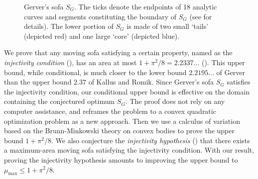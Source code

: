 \begin{figure}
\centering

\caption{Gerver’s sofa \(S_G\). The ticks denote the endpoints of 18 analytic curves and segments constituting the boundary of \(S_G\) (see \autocite{romikDifferentialEquationsExact2018} for details). The lower portion of \(S_G\) is made of two small ‘tails’ (depicted red) and one large ‘core’ (depicted blue).}
\label{fig:gerver}
\end{figure}

We prove that any moving sofa satisfying a certain property, named as the \emph{injectivity condition} (), has an area at most \(1 + \pi^2/8 = 2.2337\dots\) (). This upper bound, while conditional, is much closer to the lower bound \(2.2195\dots\) of Gerver than the upper bound \(2.37\) of Kallus and Romik. Since Gerver’s sofa \(S_G\) satisfies the injectivity condition, our conditional upper bound is effective on the domain containing the conjectured optimum \(S_G\). The proof does not rely on any computer assistance, and reframes the problem to a convex quadratic optimization problem as a new approach. Then we use a calculus of variation based on the Brunn-Minkowski theory on convex bodies to prove the upper bound \(1 + \pi^2/8\). We also conjecture the \emph{injectivity hypothesis} () that there exists a maximum-area moving sofa satisfying the injectivity condition. With our result, proving the injectivity hypothesis amounts to improving the upper bound to \(\mu_{\max} \leq 1 + \pi^2/8\).
